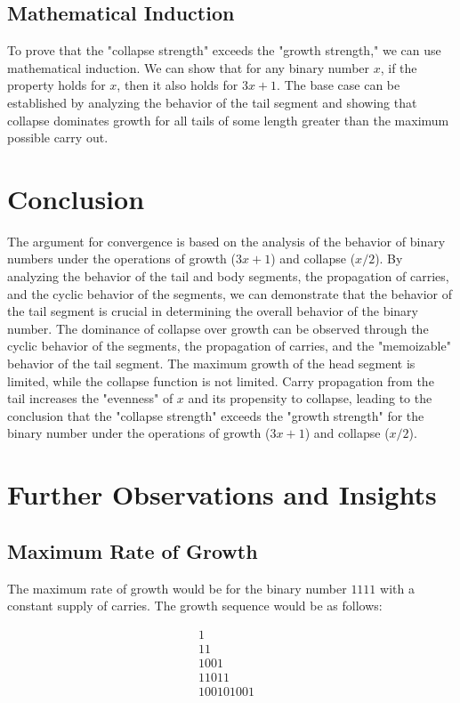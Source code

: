 \documentclass{article}
\begin{document}
\subsection{Mathematical Induction}
To prove that the "collapse strength" exceeds the "growth strength," we can use mathematical induction. We can show that for any binary number $x$, if the property holds for $x$, then it also holds for $3x + 1$. The base case can be established by analyzing the behavior of the tail segment and showing that collapse dominates growth for all tails of some length greater than the maximum possible carry out.

\section{Conclusion}
The argument for convergence is based on the analysis of the behavior of binary numbers under the operations of growth ($3x + 1$) and collapse ($x/2$). By analyzing the behavior of the tail and body segments, the propagation of carries, and the cyclic behavior of the segments, we can demonstrate that the behavior of the tail segment is crucial in determining the overall behavior of the binary number. The dominance of collapse over growth can be observed through the cyclic behavior of the segments, the propagation of carries, and the "memoizable" behavior of the tail segment. The maximum growth of the head segment is limited, while the collapse function is not limited. Carry propagation from the tail increases the "evenness" of $x$ and its propensity to collapse, leading to the conclusion that the "collapse strength" exceeds the "growth strength" for the binary number under the operations of growth ($3x + 1$) and collapse ($x/2$).
\section{Further Observations and Insights}

\subsection{Maximum Rate of Growth}
The maximum rate of growth would be for the binary number $1111$ with a constant supply of carries. The growth sequence would be as follows:

\begin{align*}
1 & \\
11 & \\
1001 & \\
11011 & \\
100101001 & \\
\end{align*}
\end{document}
